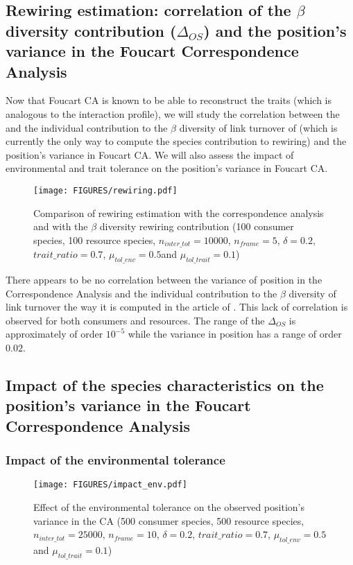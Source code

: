 \subsection{Rewiring estimation: correlation of the $\beta$ diversity contribution ($\Delta_{OS}$) and the position's variance in the Foucart Correspondence Analysis}

Now that Foucart CA is known to be able to reconstruct the traits (which is analogous to the interaction profile), we will study the correlation between the and the individual contribution to the $\beta$ diversity of link turnover of \citet{toju_interaction_2024} (which is currently the only way to compute the species contribution to rewiring) and the position's variance in Foucart CA. 
We will also assess the impact of environmental and trait tolerance on the position's variance in Foucart CA.

\begin{figure}[H]
    \centering
    \texttt{[image: FIGURES/rewiring.pdf]}
    \caption{Comparison of rewiring estimation with the correspondence analysis and with the $\beta$ diversity rewiring contribution (100 consumer species, 100 resource species, $n_{inter\_tot} = 10000$, $n_{frame} = 5$, $\delta =  0.2$, $trait\_ratio = 0.7$, $\mu_{tol\_env} = 0.5$and $\mu_{tol\_trait} = 0.1$)}
    \label{fig:toju}
\end{figure}

There appears to be no correlation between the variance of position in the Correspondence Analysis and the individual contribution to the $\beta$ diversity of link turnover the way it is computed in the article of \citet{toju_interaction_2024}. This lack of correlation is observed for both consumers and resources. The range of the $\Delta_{OS}$ is approximately of order $10^{-5}$ while the variance in position has a range of order $0.02$.



\subsection{Impact of the species characteristics on the position's variance in the Foucart Correspondence Analysis}

\subsubsection{Impact of the environmental tolerance}

\begin{figure}[H]
    \centering
    \texttt{[image: FIGURES/impact\_env.pdf]}
    \caption{Effect of the environmental tolerance on the observed position's variance in the CA (500 consumer species, 500 resource species, $n_{inter\_tot} = 25000$, $n_{frame} = 10$, $\delta =  0.2$, $trait\_ratio = 0.7$, $\mu_{tol\_env} = 0.5$ and $\mu_{tol\_trait} = 0.1$)}
    \label{fig:effect_env}
\end{figure}

